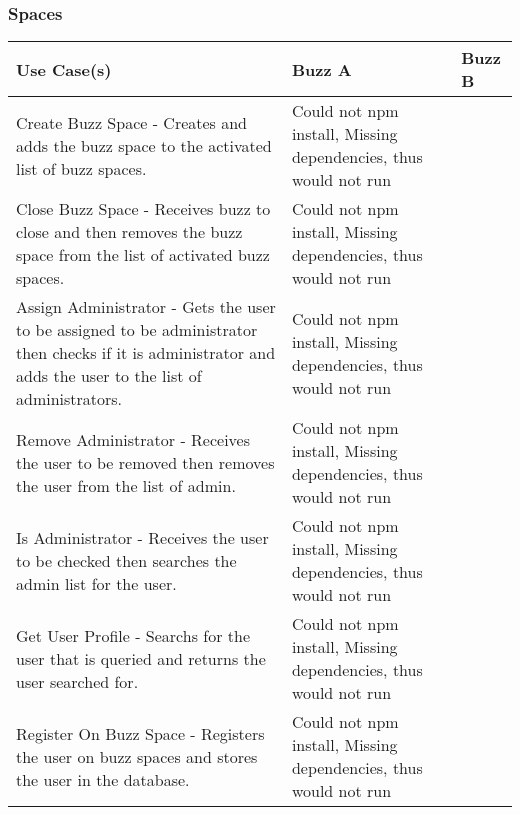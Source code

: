 \documentclass[12pt]{article}
\begin{document}
\subsubsection{Spaces}%
\begin{tabular}{|p{4.5cm}|p{4.5cm}|p{4.5cm}|}

\hline
Use Case(s) & Buzz A & Buzz B \\ 
\hline
Create Buzz Space - Creates and adds the buzz space to the activated list of buzz spaces. & Could not npm install, Missing dependencies, thus would not run &  \\ %
\hline
Close Buzz Space - Receives buzz to close and then removes the buzz space from the list of activated buzz spaces. & Could not npm install, Missing dependencies, thus would not run & \\ %
\hline
Assign Administrator - Gets the user to be assigned to be administrator then checks if it is administrator and adds the user to the list of administrators.  & Could not npm install, Missing dependencies, thus would not run & \\ %
\hline
Remove Administrator - Receives the user to be removed then removes the user from the list of admin. & Could not npm install, Missing dependencies, thus would not run &  \\ %
\hline
Is Administrator - Receives the user to be checked then searches the admin list for the user.  & Could not npm install, Missing dependencies, thus would not run &  \\ %
\hline
Get User Profile -  Searchs for the user that is queried and returns the user searched for. & Could not npm install, Missing dependencies, thus would not run &  \\ %
\hline
Register On Buzz Space - Registers the user on buzz spaces and stores the user in the database. & Could not npm install, Missing dependencies, thus would not run &  \\ %
\hline


\end{tabular}
\end{document}
